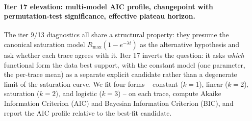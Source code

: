 \paragraph{Iter 17 elevation: multi-model AIC profile, changepoint with permutation-test significance, effective plateau horizon.}
\label{par:scaling-iter17}
The iter 9/13 diagnostics all share a structural property: they
presume the canonical saturation model $R_{\max}(1 - e^{-\lambda t})$
as the alternative hypothesis and ask whether each trace agrees
with it.  Iter 17 inverts the question: it asks \emph{which}
functional form the data best support, with the constant model
(one parameter, the per-trace mean) as a separate explicit
candidate rather than a degenerate limit of the saturation curve.
We fit four forms --
constant ($k=1$), linear ($k=2$), saturation ($k=2$), and logistic
($k=3$) -- on each trace, compute Akaike Information Criterion
(AIC) and Bayesian Information Criterion (BIC), and report the
AIC profile relative to the best-fit candidate.

